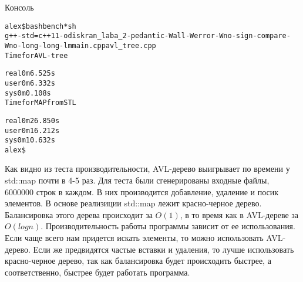 Консоль
\begin{alltt}
alex\$ bash bench*sh
g++ -std=c++11 -o diskran_laba_2 -pedantic -Wall -Werror -Wno-sign-compare -Wno-long-long -lm main.cpp avl_tree.cpp
Time for AVL-tree

real    0m6.525s
user    0m6.332s
sys     0m0.108s
Time for MAP from STL

real    0m26.850s
user    0m16.212s
sys     0m10.632s
alex\$
\end{alltt}
Как видно из теста производительности, AVL-дерево выигрывает по времени у std::map почти в 4-5 раз. Для теста были сгенерированы входные файлы, 6000000 строк в каждом. В них производится добавление, удаление и посик элементов. 
В основе реализиции std::map лежит красно-черное дерево. Балансировка этого дерева происходит за $O(1)$, в то время как в AVL-дереве за $O(logn)$. Производительность работы программы зависит от ее использования. Если чаще всего нам придется искать элементы, то можно использовать AVL-дерево. Если же предвидятся частые вставки и удаления, то лучше использовать красно-черное дерево, так как балансировка будет происходить быстрее, а соответственно, быстрее будет работать программа.
\pagebreak
